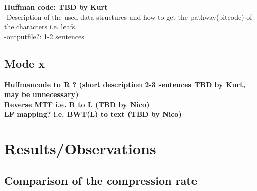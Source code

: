 \documentclass[11pt, notitlepage]{scrartcl}
\begin{document}
\textbf{Huffman code: TBD by Kurt}\\
-Description of the used data structures and how to get the pathway(bitcode) of the characters i.e. leafs.\\
-outputfile?: 1-2 sentences

\subsection{Mode x}
\textbf{Huffmancode to R ?  (short description 2-3 sentences TBD by Kurt, may be unnecessary)}\\
\textbf{Reverse MTF i.e. R to L (TBD by Nico)}\\
\textbf{LF mapping? i.e. BWT(L) to text (TBD by Nico)}\\

\section{Results/Observations}
\subsection*{Comparison of the compression rate}


\end{document}
